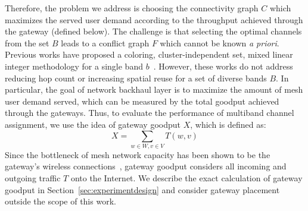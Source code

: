 


Therefore, the problem we address is choosing the connectivity graph $C$ which maximizes
the served user demand according to the throughput achieved through the gateway (defined below).
The challenge is that selecting the optimal channels from
the set $B$ leads to a conflict graph $F$ which cannot be known {\it a priori}. Previous
works have proposed a coloring, cluster-independent set, mixed linear integer methodology
for a single band $b$~\cite{mishra2005weighted,peng2012efficient,tang2005interference}. However,
these works do not address reducing hop count or increasing spatial reuse for a set of 
diverse bands $B$.  In particular, the goal of network backhaul layer is to maximize the amount of mesh user demand served, which
can be measured by the total goodput achieved through the gateways. Thus, to evaluate the 
performance of multiband channel assignment, we use the idea of gateway goodput $X$, which
is defined as:
\begin{equation}
\label{eq:goodput}
X=\sum_{w \in W, v \in V}T(w,v)
\end{equation}
Since the bottleneck of mesh network capacity has been shown to be the gateway's wireless 
connections~\cite{robinson2008adding}, gateway goodput considers all incoming and outgoing
traffic $T$ onto the Internet. We describe the exact calculation of gateway goodput in 
Section~\ref{sec:experimentdesign} and consider gateway placement outside the scope of this work.

